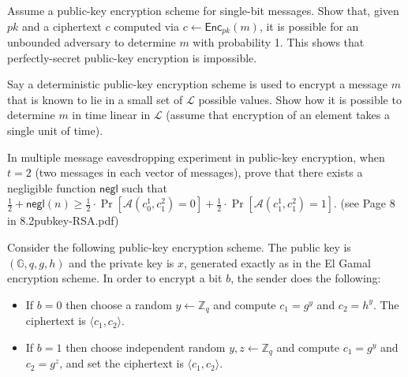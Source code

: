 \documentclass[12pt,letterpaper,boxed]{amspset}
\begin{document}
\begin{problem}[10.1]
Assume a public-key encryption scheme for single-bit messages. Show that, given $pk$ and a ciphertext $c$ computed via $c \gets \mathsf{Enc}_{pk}(m)$, it is possible for an unbounded adversary to determine $m$ with probability 1. This shows that perfectly-secret public-key encryption is impossible.
\end{problem}

\begin{solution}
\vspace{3cm}

\end{solution}

\begin{problem}[10.2]
Say a deterministic public-key encryption scheme is used to encrypt a message $m$ that is known to lie in a small set of $\mathcal{L}$ possible values. Show how it is possible to determine $m$ in time linear in $\mathcal{L}$ (assume that encryption of an element takes a single unit of time).
\end{problem}

\begin{solution}
\vspace{3cm}

\end{solution}

\begin{problem}[10.3]
In multiple message eavesdropping experiment in public-key encryption, when $t=2$ (two messages in each vector of messages), prove that there exists a negligible function $\mathsf{negl}$ such that $\frac{1}{2}+\mathsf{negl}(n) \ge \frac{1}{2}\cdot \Pr[\mathcal{A}(c_0^1,c_1^2)=0] + \frac{1}{2}\cdot \Pr[\mathcal{A}(c_1^1,c_1^2)=1].$ (see Page 8 in 8.2pubkey-RSA.pdf)
\end{problem}

\begin{solution}
\vspace{6cm}

\end{solution}

\begin{problem}[10.4]
Consider the following public-key encryption scheme. The public key is $(\mathbb{G},q,g,h)$ and the private key is $x$, generated exactly as in the El Gamal encryption scheme. In order to encrypt a bit $b$, the sender does the following:
\begin{itemize}
\item If $b=0$ then choose a random $y \gets \mathbb{Z}_q$ and compute $c_1= g^y$ and $c_2=h^y$. The ciphertext is $\langle c_1,c_2\rangle$.
\item If $b=1$ then choose independent random $y,z \gets \mathbb{Z}_q$ and compute $c_1= g^y$ and $c_2=g^z$, and set the ciphertext is $\langle c_1,c_2\rangle$.
\end{itemize}
\end{problem}
\end{document}
